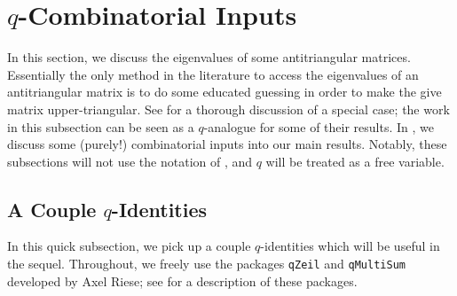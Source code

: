 
\section{\texorpdfstring{$q$}{q}-Combinatorial Inputs} \label{sec:qcombo}
In this section, we discuss the eigenvalues of some antitriangular matrices. Essentially the only method in the literature to access the eigenvalues of an antitriangular matrix is to do some educated guessing in order to make the give matrix upper-triangular. See \cite{britnell-antitriangular} for a thorough discussion of a special case; the work in this subsection can be seen as a $q$-analogue for some of their results. In , we discuss some (purely!) combinatorial inputs into our main results. Notably, these subsections will not use the notation of , and $q$ will be treated as a free variable.

\subsection{A Couple \texorpdfstring{$q$}{q}-Identities} \label{subsec:q-ids}
In this quick subsection, we pick up a couple $q$-identities which will be useful in the sequel. Throughout, we freely use the packages \texttt{qZeil} and \texttt{qMultiSum} developed by Axel Riese; see \cite{riese-zeil,riese-multisum} for a description of these packages.

